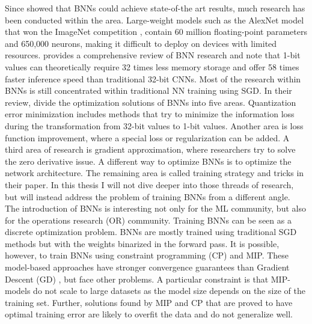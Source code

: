 \noindent Since \cite{Hubara2016} showed that BNNs could achieve state-of-the art results, much research has been conducted within the area. Large-weight models such as the AlexNet model that won the ImageNet competition \citep{imagenet2012}, contain 60 million floating-point parameters and 650,000 neurons, making it difficult to deploy on devices with limited resources. \cite{yuan2023} provides a comprehensive review of BNN research and note that 1-bit values can theoretically require 32 times less memory storage and offer 58 times faster inference speed than traditional 32-bit CNNs. Most of the research within BNNs is still concentrated within traditional NN training using SGD. In their review, \cite{yuan2023} divide the optimization solutions of BNNs into five areas. Quantization error minimization includes methods that try to minimize the information loss during the transformation from 32-bit values to 1-bit values. Another area is loss function improvement, where a special loss or regularization can be added. A third area of research is gradient approximation, where researchers try to solve the zero derivative issue. A different way to optimize BNNs is to optimize the network architecture. The remaining area is called training strategy and tricks in their paper. In this thesis I will not dive deeper into those threads of research, but will instead address the problem of training BNNs from a different angle.\\

\noindent The introduction of BNNs is interesting not only for the ML community, but also for the operations research (OR) community. Training BNNs can be seen as a discrete optimization problem. BNNs are mostly trained using traditional SGD methods but with the weights binarized in the forward pass. It is possible, however, to train BNNs using constraint programming (CP) and MIP. These model-based approaches have stronger convergence guarantees than Gradient Descent (GD) \citep{icarte2019}, but face other problems. A particular constraint is that MIP-models do not scale to large datasets as the model size depends on the size of the training set. Further, solutions found by MIP and CP that are proved to have optimal training error are likely to overfit the data and do not generalize well. \\

